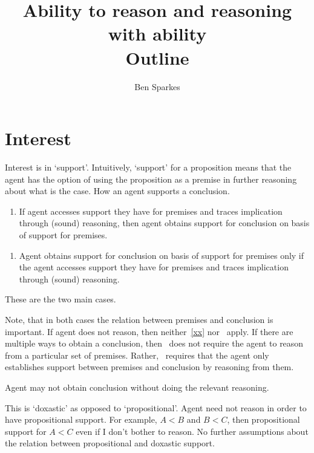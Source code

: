 \documentclass[10pt]{article}
\title{
  Ability to reason and reasoning with ability \\
  \large Outline
}
\author{Ben Sparkes}
\begin{document}
\tableofcontents

\newpage

\maketitle

\section{Interest}
\label{sec:interest}

Interest is in `support'.
Intuitively, `support' for a proposition means that the agent has the option of using the proposition as a premise in further reasoning about what is the case.
How an agent supports a conclusion.

\begin{enumerate}
\item\label{xx} If agent accesses support they have for premises and traces implication through (sound) reasoning, then agent obtains support for conclusion on basis of support for premises.
\end{enumerate}

\begin{enumerate}[label=\mp{}, ref=\mp{}]
\item\label{denied-claim} Agent obtains support for conclusion on basis of support for premises only if the agent accesses support they have for premises and traces implication through (sound) reasoning.
\end{enumerate}

These are the two main cases.

Note, that in both cases the relation between premises and conclusion is important.
If agent does not reason, then neither~\ref{xx} nor~\label{denied-claim} apply.
If there are multiple ways to obtain a conclusion, then~\label{denied-claim} does not require the agent to reason from a particular set of premises.
Rather,~\label{denied-claim} requires that the agent only establishes support between premises and conclusion by reasoning from them.

Agent may not obtain conclusion without doing the relevant reasoning.

This is `doxastic' as opposed to `propositional'.
Agent need not reason in order to have propositional support.
For example, \(A < B\) and \(B < C\), then propositional support for \(A < C\) even if I don't bother to reason.
No further assumptions about the relation between propositional and doxastic support.
\end{document}

